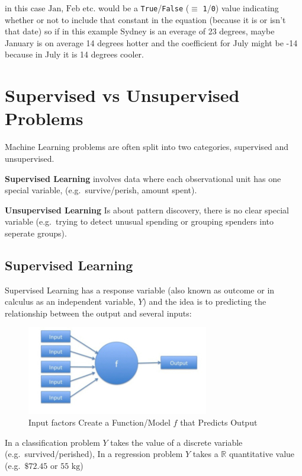 \documentclass[]{book}
\begin{document}
in this case \(\text{Jan}\), \(\text{Feb}\) etc. would be a \texttt{True}/\texttt{False} (\(\equiv\) \texttt{1}/\texttt{0}) value indicating whether or not to include that constant in the equation (because it is or isn't that date) so if in this example Sydney is an everage of 23 degrees, maybe January is on average 14 degrees hotter and the coefficient for July might be -14 because in July it is 14 degrees cooler.

\hypertarget{supervised-vs-unsupervised-problems}{%
\section{Supervised vs Unsupervised Problems}\label{supervised-vs-unsupervised-problems}}

Machine Learning problems are often split into two categories, supervised and unsupervised.

\textbf{Supervised Learning} involves data where each observational unit has one special variable, (e.g.~survive/perish, amount spent).

\textbf{Unsupervised Learning} Is about pattern discovery, there is no clear special variable (e.g.~trying to detect unusual spending or grouping spenders into seperate groups).

\hypertarget{supervised-learning}{%
\subsection{Supervised Learning}\label{supervised-learning}}

Supervised Learning has a response variable (also known as outcome or in calculus as an independent variable, \(Y\)) and the idea is to predicting the relationship between the output and several inputs:

\begin{figure}
\centering
\includegraphics{images/supfunc300px.jpg}
\caption{Input factors Create a Function/Model \(f\) that Predicts Output}
\end{figure}

In a classification problem \(Y\) takes the value of a discrete variable (e.g.~survived/perished), In a regression problem \(Y\) takes a \(\mathbb{R}\) quantitative value (e.g.~\(\$72.45\) or \(55 \text{ kg}\))
\end{document}
